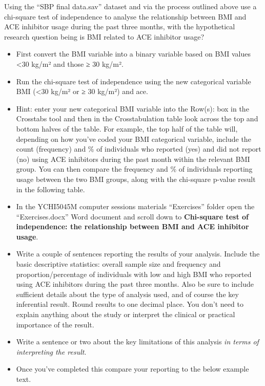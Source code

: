 \documentclass[
]{book}
\begin{document}
Using the ``SBP final data.sav'' dataset and via the process outlined above use a chi-square test of independence to analyse the relationship between BMI and ACE inhibitor usage during the past three months, with the hypothetical research question being is BMI related to ACE inhibitor usage?

\begin{itemize}
\item
  First convert the BMI variable into a binary variable based on BMI values \textless30 kg/m² and those ≥ 30 kg/m².
\item
  Run the chi-square test of independence using the new categorical variable BMI (\textless30 kg/m² or ≥ 30 kg/m²) and ace.
\item
  Hint: enter your new categorical BMI variable into the Row(s): box in the Crosstabs tool and then in the Crosstabulation table look across the top and bottom halves of the table. For example, the top half of the table will, depending on how you've coded your BMI categorical variable, include the count (frequency) and \% of individuals who reported (yes) and did not report (no) using ACE inhibitors during the past month within the relevant BMI group. You can then compare the frequency and \% of individuals reporting usage between the two BMI groups, along with the chi-square p-value result in the following table.
\item
  In the YCHI5045M computer sessions materials ``Exercises'' folder open the ``Exercises.docx'' Word document and scroll down to \textbf{Chi-square test of independence: the relationship between BMI and ACE inhibitor usage}.
\item
  Write a couple of sentences reporting the results of your analysis. Include the basic descriptive statistics: overall sample size and frequency and proportion/percentage of individuals with low and high BMI who reported using ACE inhibitors during the past three months. Also be sure to include sufficient details about the type of analysis used, and of course the key inferential result. Round results to one decimal place. You don't need to explain anything about the study or interpret the clinical or practical importance of the result.
\item
  Write a sentence or two about the key limitations of this analysis \emph{in terms of interpreting the result}.
\item
  Once you've completed this compare your reporting to the below example text.
\end{itemize}
\end{document}
